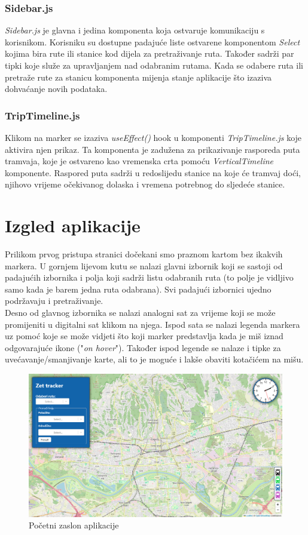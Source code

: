 \documentclass[zavrsnirad]{fer}
\begin{document}
\subsubsection{Sidebar.js}
\textit{Sidebar.js} je glavna i jedina komponenta koja ostvaruje komunikaciju s korisnikom. Korisniku su dostupne padajuće liste ostvarene komponentom \textit{Select} kojima bira rute ili stanice kod dijela za pretraživanje ruta. Također sadrži par tipki koje služe za upravljanjem nad odabranim rutama. Kada se odabere ruta ili pretraže rute za stanicu komponenta mijenja stanje aplikacije što izaziva dohvaćanje novih podataka.

\subsubsection{TripTimeline.js}
Klikom na marker se izaziva \textit{useEffect()} hook u komponenti \textit{TripTimeline.js} koje aktivira njen prikaz. Ta komponenta je zadužena za prikazivanje rasporeda puta tramvaja, koje je ostvareno kao vremenska crta pomoću \textit{VerticalTimeline} komponente. Raspored puta sadrži u redoslijedu stanice na koje će tramvaj doći, njihovo vrijeme očekivanog dolaska i vremena potrebnog do sljedeće stanice.

\newpage
\section{Izgled aplikacije}
Prilikom prvog pristupa stranici dočekani smo praznom kartom bez ikakvih markera. U gornjem lijevom kutu se nalazi glavni izbornik koji se sastoji od padajućih izbornika i polja koji sadrži listu odabranih ruta (to polje je vidljivo samo kada je barem jedna ruta odabrana). Svi padajući izbornici ujedno podržavaju i pretraživanje.\\
Desno od glavnog izbornika se nalazi analogni sat za vrijeme koji se može promijeniti u digitalni sat klikom na njega. Ispod sata se nalazi legenda markera uz pomoć koje se može vidjeti što koji marker predstavlja kada je miš iznad odgovarajuće ikone ("\textit{on hover}"). Također ispod legende se nalaze i tipke za uvećavanje/smanjivanje karte, ali to je moguće i lakše obaviti kotačićem na mišu.

\begin{figure}[H]
	\centering
	\includegraphics[width=\linewidth]{Figures/default.png} 
	\caption{Početni zaslon aplikacije}
	\label{slk:default}
\end{figure}
\end{document}

